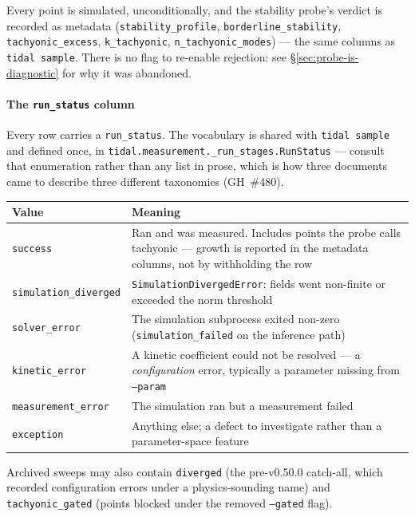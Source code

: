 Every point is simulated, unconditionally, and the stability probe's
verdict is recorded as metadata (\texttt{stability\_profile},
\texttt{borderline\_stability}, \texttt{tachyonic\_excess},
\texttt{k\_tachyonic}, \texttt{n\_tachyonic\_modes}) --- the same
columns as \texttt{tidal sample}.  There is no flag to re-enable
rejection: see \S\ref{sec:probe-is-diagnostic} for why it was
abandoned.

\paragraph{The \texttt{run\_status} column}
Every row carries a \texttt{run\_status}.  The vocabulary is shared
with \texttt{tidal sample} and defined once, in
\texttt{tidal.measurement.\_run\_stages.RunStatus} --- consult that
enumeration rather than any list in prose, which is how three documents
came to describe three different taxonomies (GH~\#480).

\begin{table}[htbp]
\centering
\begin{tabular}{@{}lp{8cm}@{}}
\toprule
Value & Meaning \\
\midrule
\texttt{success}             & Ran and was measured.  Includes points the probe calls tachyonic --- growth is reported in the metadata columns, not by withholding the row \\
\texttt{simulation\_diverged} & \texttt{SimulationDivergedError}: fields went non-finite or exceeded the norm threshold \\
\texttt{solver\_error}       & The simulation subprocess exited non-zero (\texttt{simulation\_failed} on the inference path) \\
\texttt{kinetic\_error}      & A kinetic coefficient could not be resolved --- a \emph{configuration} error, typically a parameter missing from \texttt{--param} \\
\texttt{measurement\_error}  & The simulation ran but a measurement failed \\
\texttt{exception}           & Anything else; a defect to investigate rather than a parameter-space feature \\
\bottomrule
\end{tabular}
\end{table}

Archived sweeps may also contain \texttt{diverged} (the pre-v0.50.0
catch-all, which recorded configuration errors under a physics-sounding
name) and \texttt{tachyonic\_gated} (points blocked under the removed
\texttt{--gated} flag).

